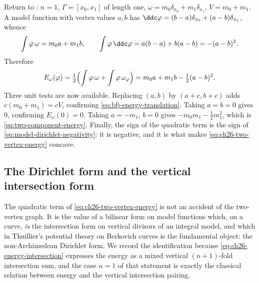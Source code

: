 \begin{example}
\label{ex:ch26-normalization-audit}
Return to : \(n=1\), \(\Gamma=[x_0,x_1]\) of length
one, \(\omega=m_0\delta_{x_0}+m_1\delta_{x_1}\), \(V=m_0+m_1\).  A model
function with vertex values \(a,b\) has
\(\ddc\varphi=(b-a)\delta_{x_0}+(a-b)\delta_{x_1}\), whence
\[
 \int\varphi\,\omega=m_0a+m_1b,
 \qquad
 \int\varphi\,\ddc\varphi=a(b-a)+b(a-b)=-(a-b)^2 .
\]
Therefore
\begin{equation}
\label{eq:ch26-two-vertex-energy}
 E_\omega(\varphi)
 =\tfrac12\Bigl(\int\varphi\,\omega+\int\varphi\,\omega_\varphi\Bigr)
 =m_0a+m_1b-\tfrac12(a-b)^2 .
\end{equation}
Three unit tests are now available.  Replacing \((a,b)\) by \((a+c,b+c)\)
adds \(c(m_0+m_1)=cV\), confirming
\eqref{eq:bfj-energy-translation}.  Taking \(a=b=0\) gives \(0\), confirming
\(E_\omega(0)=0\).  Taking \(a=-m_1\), \(b=0\) gives
\(-m_0m_1-\tfrac12m_1^2\), which is \eqref{eq:two-component-energy}.  Finally,
the sign of the quadratic term is the sign of
\eqref{eq:model-dirichlet-negativity}: it is negative, and it is what makes
\eqref{eq:ch26-two-vertex-energy} concave.
\end{example}

\subsection{The Dirichlet form and the vertical intersection form}
\label{sec:ch26-dirichlet-vertical}

The quadratic term of \eqref{eq:ch26-two-vertex-energy} is not an accident of
the two-vertex graph.  It is the value of a bilinear form on model functions
which, on a curve, \emph{is} the intersection form on vertical divisors of
an integral model, and which in Thuillier's potential theory on Berkovich
curves is the fundamental object: the non-Archimedean Dirichlet form.  We
record the identification because \eqref{eq:ch26-energy-intersection}
expresses the energy as a mixed vertical \((n+1)\)-fold intersection sum, and the case
\(n=1\) of that statement is exactly the classical relation between energy
and the vertical intersection pairing.


